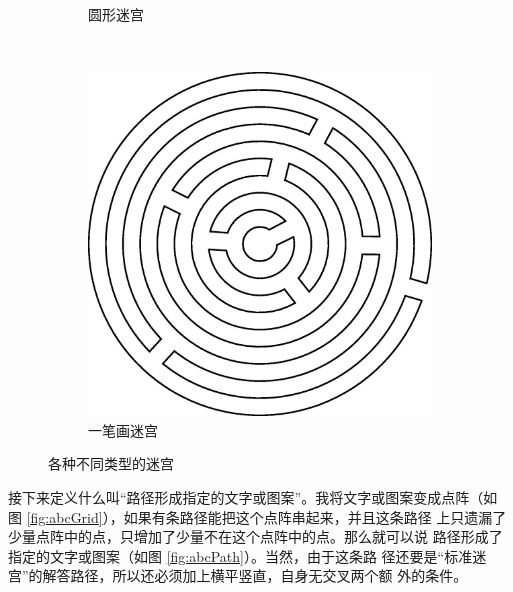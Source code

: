 \documentclass[cs4size,a4paper,adobefonts]{ctexart}
\begin{document}
\begin{figure}[htbp]
\begin{subfigure}[c]{0.31\textwidth}
    \caption{圆形迷宫}\label{fig:diskMaze}
  \end{subfigure}
  ~
  \begin{subfigure}[c]{0.31\textwidth}
    \centering
    \includegraphics[width=\textwidth]{eulerMaze}
    \caption{一笔画迷宫}
  \end{subfigure}
  \caption{各种不同类型的迷宫}\label{fig:manyMazes}
\end{figure}

接下来定义什么叫“路径形成指定的文字或图案”。我将文字或图案变成点阵（如
  图 \ref{fig:abcGrid}），如果有条路径能把这个点阵串起来，并且这条路径
上只遗漏了少量点阵中的点，只增加了少量不在这个点阵中的点。那么就可以说
路径形成了指定的文字或图案（如图 \ref{fig:abcPath}）。当然，由于这条路
径还要是“标准迷宫”的解答路径，所以还必须加上横平竖直，自身无交叉两个额
外的条件。
\end{document}
